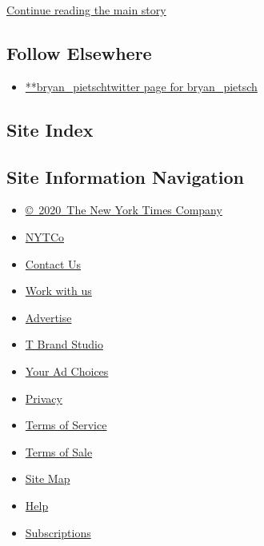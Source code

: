 \protect\hyperlink{after-mid2}{Continue reading the main story}

\hypertarget{follow-elsewhere}{%
\subsection{Follow Elsewhere}\label{follow-elsewhere}}

\begin{itemize}
\tightlist
\item
  \href{https://twitter.com/bryan_pietsch}{**bryan\_pietschtwitter page
  for bryan\_pietsch}
\end{itemize}

\hypertarget{site-index}{%
\subsection{Site Index}\label{site-index}}

\hypertarget{site-information-navigation}{%
\subsection{Site Information
Navigation}\label{site-information-navigation}}

\begin{itemize}
\tightlist
\item
  \href{https://help.nytimes3xbfgragh.onion/hc/en-us/articles/115014792127-Copyright-notice}{©~2020~The
  New York Times Company}
\end{itemize}

\begin{itemize}
\tightlist
\item
  \href{https://www.nytco.com/}{NYTCo}
\item
  \href{https://help.nytimes3xbfgragh.onion/hc/en-us/articles/115015385887-Contact-Us}{Contact
  Us}
\item
  \href{https://www.nytco.com/careers/}{Work with us}
\item
  \href{https://nytmediakit.com/}{Advertise}
\item
  \href{http://www.tbrandstudio.com/}{T Brand Studio}
\item
  \href{https://www.nytimes3xbfgragh.onion/privacy/cookie-policy\#how-do-i-manage-trackers}{Your
  Ad Choices}
\item
  \href{https://www.nytimes3xbfgragh.onion/privacy}{Privacy}
\item
  \href{https://help.nytimes3xbfgragh.onion/hc/en-us/articles/115014893428-Terms-of-service}{Terms
  of Service}
\item
  \href{https://help.nytimes3xbfgragh.onion/hc/en-us/articles/115014893968-Terms-of-sale}{Terms
  of Sale}
\item
  \href{https://spiderbites.nytimes3xbfgragh.onion}{Site Map}
\item
  \href{https://help.nytimes3xbfgragh.onion/hc/en-us}{Help}
\item
  \href{https://www.nytimes3xbfgragh.onion/subscription?campaignId=37WXW}{Subscriptions}
\end{itemize}
